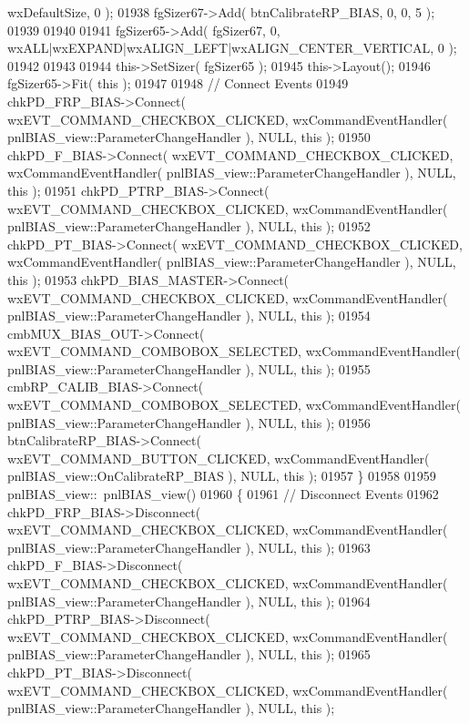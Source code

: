 \begin{DoxyCode}
      wxDefaultSize, 0 );
01938     fgSizer67->Add( btnCalibrateRP_BIAS, 0, 0, 5 );
01939     
01940     
01941     fgSizer65->Add( fgSizer67, 0, wxALL|wxEXPAND|wxALIGN\_LEFT|wxALIGN\_CENTER\_VERTICAL, 0 );
01942     
01943     
01944     this->SetSizer( fgSizer65 );
01945     this->Layout();
01946     fgSizer65->Fit( \textcolor{keyword}{this} );
01947     
01948     \textcolor{comment}{// Connect Events}
01949     chkPD_FRP_BIAS->Connect( wxEVT\_COMMAND\_CHECKBOX\_CLICKED, wxCommandEventHandler( 
      pnlBIAS_view::ParameterChangeHandler ), NULL, \textcolor{keyword}{this} );
01950     chkPD_F_BIAS->Connect( wxEVT\_COMMAND\_CHECKBOX\_CLICKED, wxCommandEventHandler( 
      pnlBIAS_view::ParameterChangeHandler ), NULL, \textcolor{keyword}{this} );
01951     chkPD_PTRP_BIAS->Connect( wxEVT\_COMMAND\_CHECKBOX\_CLICKED, wxCommandEventHandler( 
      pnlBIAS_view::ParameterChangeHandler ), NULL, \textcolor{keyword}{this} );
01952     chkPD_PT_BIAS->Connect( wxEVT\_COMMAND\_CHECKBOX\_CLICKED, wxCommandEventHandler( 
      pnlBIAS_view::ParameterChangeHandler ), NULL, \textcolor{keyword}{this} );
01953     chkPD_BIAS_MASTER->Connect( wxEVT\_COMMAND\_CHECKBOX\_CLICKED, wxCommandEventHandler( 
      pnlBIAS_view::ParameterChangeHandler ), NULL, \textcolor{keyword}{this} );
01954     cmbMUX_BIAS_OUT->Connect( wxEVT\_COMMAND\_COMBOBOX\_SELECTED, wxCommandEventHandler( 
      pnlBIAS_view::ParameterChangeHandler ), NULL, \textcolor{keyword}{this} );
01955     cmbRP_CALIB_BIAS->Connect( wxEVT\_COMMAND\_COMBOBOX\_SELECTED, wxCommandEventHandler( 
      pnlBIAS_view::ParameterChangeHandler ), NULL, \textcolor{keyword}{this} );
01956     btnCalibrateRP_BIAS->Connect( wxEVT\_COMMAND\_BUTTON\_CLICKED, wxCommandEventHandler( 
      pnlBIAS_view::OnCalibrateRP_BIAS ), NULL, \textcolor{keyword}{this} );
01957 \}
01958 
01959 pnlBIAS_view::~pnlBIAS_view()
01960 \{
01961     \textcolor{comment}{// Disconnect Events}
01962     chkPD_FRP_BIAS->Disconnect( wxEVT\_COMMAND\_CHECKBOX\_CLICKED, wxCommandEventHandler( 
      pnlBIAS_view::ParameterChangeHandler ), NULL, \textcolor{keyword}{this} );
01963     chkPD_F_BIAS->Disconnect( wxEVT\_COMMAND\_CHECKBOX\_CLICKED, wxCommandEventHandler( 
      pnlBIAS_view::ParameterChangeHandler ), NULL, \textcolor{keyword}{this} );
01964     chkPD_PTRP_BIAS->Disconnect( wxEVT\_COMMAND\_CHECKBOX\_CLICKED, wxCommandEventHandler( 
      pnlBIAS_view::ParameterChangeHandler ), NULL, \textcolor{keyword}{this} );
01965     chkPD_PT_BIAS->Disconnect( wxEVT\_COMMAND\_CHECKBOX\_CLICKED, wxCommandEventHandler( 
      pnlBIAS_view::ParameterChangeHandler ), NULL, \textcolor{keyword}{this} );

\end{DoxyCode}
